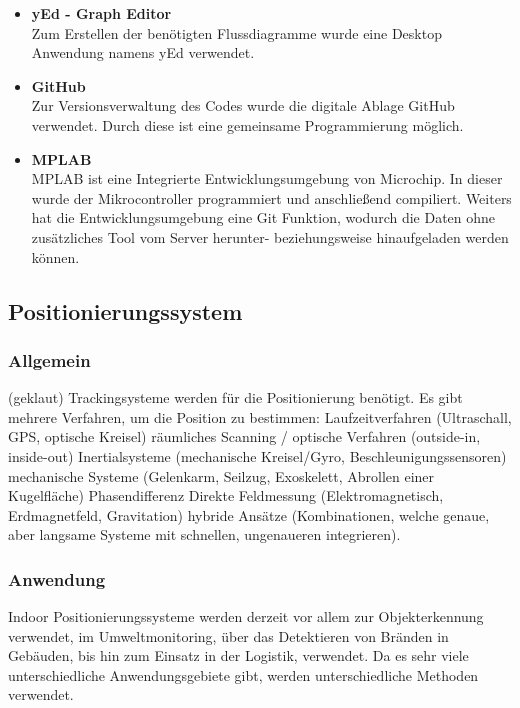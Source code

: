 \begin{itemize}
    \begin{itemize}
      \item \textbf{yEd - Graph Editor}\\ \cite{Tool_yed}
      Zum Erstellen der benötigten Flussdiagramme wurde eine Desktop Anwendung namens yEd verwendet.
      \item \textbf{GitHub}\\ \cite{Tool_github}
      Zur Versionsverwaltung des Codes wurde die digitale Ablage GitHub verwendet. Durch diese ist eine gemeinsame Programmierung möglich.
      \item \textbf{MPLAB}\\ \cite{Tool_mplab}
      MPLAB ist eine Integrierte Entwicklungsumgebung von Microchip. In dieser wurde der Mikrocontroller programmiert und anschließend compiliert.
      Weiters hat die Entwicklungsumgebung eine Git Funktion, wodurch die Daten ohne zusätzliches Tool vom Server herunter- beziehungsweise hinaufgeladen werden können. 
    \end{itemize}


  \subsection{Positionierungssystem}

    \subsubsection{Allgemein} \cite{PositionAllg}
    (geklaut)
    Trackingsysteme werden für die Positionierung benötigt.
    Es gibt mehrere Verfahren, um die Position zu bestimmen:
    Laufzeitverfahren (Ultraschall, GPS, optische Kreisel)
    räumliches Scanning / optische Verfahren (outside-in, inside-out)
    Inertialsysteme (mechanische Kreisel/Gyro, Beschleunigungssensoren)
    mechanische Systeme (Gelenkarm, Seilzug, Exoskelett, Abrollen einer Kugelfläche)
    Phasendifferenz
    Direkte Feldmessung (Elektromagnetisch, Erdmagnetfeld, Gravitation)
    hybride Ansätze (Kombinationen, welche genaue, aber langsame Systeme mit schnellen, ungenaueren integrieren).

    \subsubsection{Anwendung} \cite{posAnwendung}
    Indoor Positionierungssysteme werden derzeit vor allem zur Objekterkennung verwendet, im Umweltmonitoring, über das Detektieren von Bränden in Gebäuden, bis hin zum Einsatz in der Logistik, verwendet. Da es sehr viele unterschiedliche Anwendungsgebiete gibt, werden unterschiedliche Methoden verwendet. 


\end{itemize}
